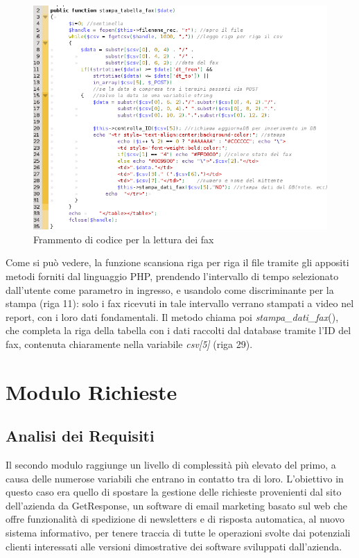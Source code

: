\begin{figure}[!ht]
\centering
  \includegraphics[scale=0.6]{./images/codicefax.png}
\caption{Frammento di codice per la lettura dei fax}
\label{codice_fax}
\end{figure}

\noindent
Come si pu\`o vedere, la funzione scansiona riga per riga il file tramite gli appositi metodi forniti dal linguaggio PHP, prendendo l'intervallo di tempo selezionato dall'utente come parametro in ingresso, e usandolo come discriminante per la stampa (riga 11): solo i fax ricevuti in tale intervallo verrano stampati a video nel report, con i loro dati fondamentali. Il metodo chiama poi \textit{stampa\_{}dati\_{}fax}(), che completa la riga della tabella con i dati raccolti dal database tramite l'ID del fax, contenuta chiaramente nella variabile \textit{csv[5]} (riga 29).


\chapter{Modulo Richieste}
\section{Analisi dei Requisiti}
Il secondo modulo raggiunge un livello di complessit\`a pi\`u elevato del primo, a causa delle numerose variabili che entrano in contatto tra di loro. L'obiettivo in questo caso era quello di spostare la gestione delle richieste provenienti dal sito dell'azienda da GetResponse, un software di email marketing basato sul web che offre funzionalit\`a di spedizione di newsletters e di risposta automatica, al nuovo sistema informativo, per tenere traccia di tutte le operazioni svolte dai potenziali clienti interessati alle versioni dimostrative dei software sviluppati dall'azienda. 

